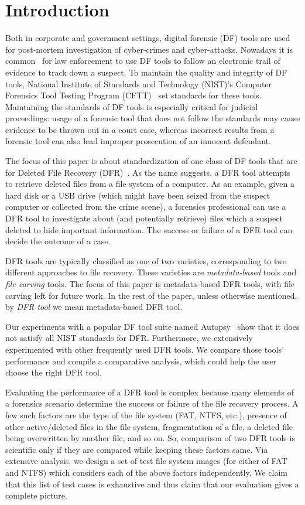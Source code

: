 
\section{Introduction}

Both in corporate and government settings, digital forensic (DF) tools are used for post-mortem investigation of cyber-crimes and cyber-attacks. 
Nowadays it is common~\cite{df:news} for law enforcement to use DF tools to follow an electronic trail of evidence to track down a suspect. 
To maintain the quality and integrity of DF tools, National Institute of Standards and Technology (NIST)'s 
Computer Forensics Tool Testing Program (CFTT)~\cite{cftt:nist} 
set standards for these tools. Maintaining the standards of DF tools 
is especially critical for judicial proceedings: usage of a forensic tool that does not follow the standards may cause evidence to be thrown 
out in a court case, whereas incorrect results from a forensic tool can also lead improper prosecution of an innocent defendant. 

The focus of this paper is about standardization of one class of DF 
tools that are for Deleted File Recovery (DFR)~\cite{meta:dfr:standards}. 
As the name suggests, a DFR tool attempts to retrieve deleted files
from a file system of a computer. As an example, given a hard disk or a USB drive 
(which might have been seized from the suspect computer or collected from the crime scene), a 
forensics professional can use a DFR tool to investigate about (and potentially retrieve) files which 
a suspect deleted to hide important information. 
The success or failure of a DFR tool can decide the outcome of a case.  

DFR tools are typically classified as one of two varieties, corresponding to two different approaches to file recovery.
These varieties are \emph{metadata-based} tools and \emph{file carving} tools.
The focus of this paper is metadata-based DFR tools, with file carving left for future work.
In the rest of the paper, unless otherwise mentioned, by \emph{DFR tool} we mean metadata-based DFR tool.

Our experiments with a popular DF tool suite named Autopsy~\cite{autopsy} 
show that it does not satisfy all NIST standards for DFR. 
Furthermore, we extensively experimented with other frequently used DFR tools. 
We compare those tools' performance and compile a comparative analysis, which could help the user choose the right DFR tool. 

Evaluating the performance of a DFR tool is complex because many elements of a forensics scenario determine 
the success or failure of the file recovery process. 
A few such factors are the type of the file system (FAT, NTFS, etc.), presence of other active/deleted 
files in the file system, fragmentation of a file, a deleted file being overwritten by another file, and so on.
So, comparison of two DFR tools is scientific only if they are compared while keeping these factors same. 
Via extensive analysis, we design a set of test file system images (for either of FAT and NTFS) which considers each of the above factors independently. 
We claim that this list of test cases is exhaustive and thus claim that our evaluation gives a complete picture. 

